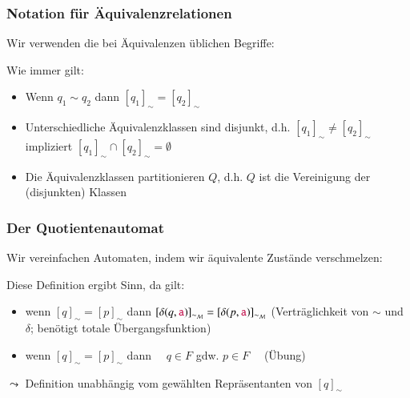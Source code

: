 \documentclass[onlymath]{beamer}
\begin{document}
\begin{frame}\frametitle{Notation für Äquivalenzrelationen}

Wir verwenden die bei Äquivalenzen üblichen Begriffe:
\medskip

Wie immer gilt:
\begin{itemize}
\item Wenn $q_1\sim q_2$ dann $[q_1]_{\sim}=[q_2]_{\sim}$
\item Unterschiedliche Äquivalenzklassen sind disjunkt, d.h. $[q_1]_{\sim}\neq [q_2]_{\sim}$ impliziert $[q_1]_{\sim}\cap [q_2]_{\sim}=\emptyset$
\item Die Äquivalenzklassen partitionieren $Q$, d.h. $Q$ ist die Vereinigung der (disjunkten) Klassen
\end{itemize}

\end{frame}

\begin{frame}\frametitle{Der Quotientenautomat}

Wir vereinfachen Automaten, indem wir äquivalente Zustände verschmelzen:

\pause

Diese Definition ergibt Sinn, da gilt:
\begin{itemize}
\item wenn $[q]_{\sim}=[p]_{\sim}$ dann $[\delta(q,\mathtt{\textcolor{purple}{a}})]_{\sim_{\mathcal{M}}}=[\delta(p,\mathtt{\textcolor{purple}{a}})]_{\sim_{\mathcal{M}}}$ (Verträglichkeit von $\sim$ und $\delta$; benötigt totale Übergangsfunktion)
\item wenn $[q]_{\sim}=[p]_{\sim}$ dann ~~$q\in F$ gdw. $p\in F$ ~~(Übung)
\end{itemize}
$\leadsto$ Definition unabhängig vom gewählten Repräsentanten von $[q]_{\sim}$

\end{frame}
\end{document}
